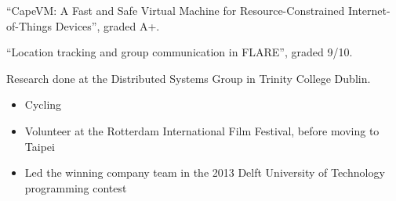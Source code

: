

“CapeVM: A Fast and Safe Virtual Machine for Resource-Constrained Internet-of-Things Devices”, graded A+.

\medskip


“Location tracking and group communication in FLARE”, graded 9/10.

\medskip

Research done at the Distributed Systems Group in Trinity College Dublin.

\bigskip
\bigskip




\bigskip
\bigskip



\begin{itemize}
\item\small{Cycling}
\item\small{Volunteer at the Rotterdam International Film Festival, before moving to Taipei}
\item\small{Led the winning company team in the 2013 Delft University of Technology programming contest}
\end{itemize}






